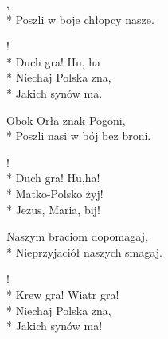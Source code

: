 \begin{lyrics}[longestline={W krwawym polu srebrne ptaszę,}]

,\\*
Poszli w boje chłopcy nasze.

\begin{chorus}
!\\*
Duch gra! Hu, ha\\*
Niechaj Polska zna,\\*
Jakich synów ma.
\end{chorus}

Obok Orła znak Pogoni,\\*
Poszli nasi w bój bez broni.

\begin{chorus}
!\\*
Duch gra! Hu,ha!\\*
Matko-Polsko żyj!\\*
Jezus, Maria, bij!
\end{chorus}

Naszym braciom dopomagaj,\\*
Nieprzyjaciół naszych smagaj.

\begin{chorus}
!\\*
Krew gra! Wiatr gra!\\*
Niechaj Polska zna,\\*
Jakich synów ma!
\end{chorus}
\end{lyrics}
